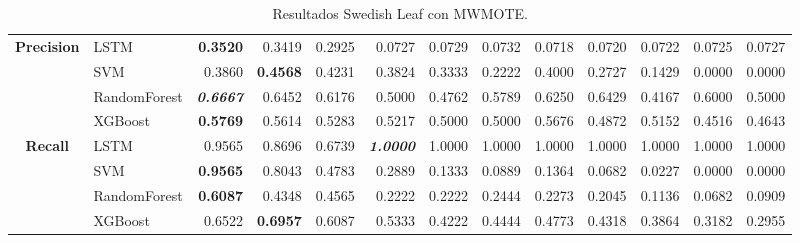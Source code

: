 \begin{table}[H]
\begin{adjustbox}{max width=14cm}
\begin{tabular}{|c|l|r|r|r|r|r|r|r|r|r|r|r|}
		\hline
		\textbf{Precision} &  LSTM & \textbf{  0.3520 } &  0.3419 &  0.2925 &  0.0727 &  0.0729 &  0.0732 &  0.0718 &  0.0720 &  0.0722 &  0.0725 &  0.0727 \\
		&  SVM &  0.3860 & \textbf{  0.4568 } &  0.4231 &  0.3824 &  0.3333 &  0.2222 &  0.4000 &  0.2727 &  0.1429 &  0.0000 &  0.0000 \\
		&  RandomForest & \textit{ \textbf{  0.6667 } } &  0.6452 &  0.6176 &  0.5000 &  0.4762 &  0.5789 &  0.6250 &  0.6429 &  0.4167 &  0.6000 &  0.5000 \\
		&  XGBoost & \textbf{  0.5769 } &  0.5614 &  0.5283 &  0.5217 &  0.5000 &  0.5000 &  0.5676 &  0.4872 &  0.5152 &  0.4516 &  0.4643 \\
		\hline
		\textbf{Recall} &  LSTM &  0.9565 &  0.8696 &  0.6739 & \textit{ \textbf{  1.0000 } } &  1.0000 &  1.0000 &  1.0000 &  1.0000 &  1.0000 &  1.0000 &  1.0000 \\
		&  SVM & \textbf{  0.9565 } &  0.8043 &  0.4783 &  0.2889 &  0.1333 &  0.0889 &  0.1364 &  0.0682 &  0.0227 &  0.0000 &  0.0000 \\
		&  RandomForest & \textbf{  0.6087 } &  0.4348 &  0.4565 &  0.2222 &  0.2222 &  0.2444 &  0.2273 &  0.2045 &  0.1136 &  0.0682 &  0.0909 \\
		&  XGBoost &  0.6522 & \textbf{  0.6957 } &  0.6087 &  0.5333 &  0.4222 &  0.4444 &  0.4773 &  0.4318 &  0.3864 &  0.3182 &  0.2955 \\
		\hline
	\end{tabular}
\end{adjustbox}
\caption{Resultados Swedish Leaf con MWMOTE.}
\label{tab:SLeaf_MWMOTE}
\end{table}

